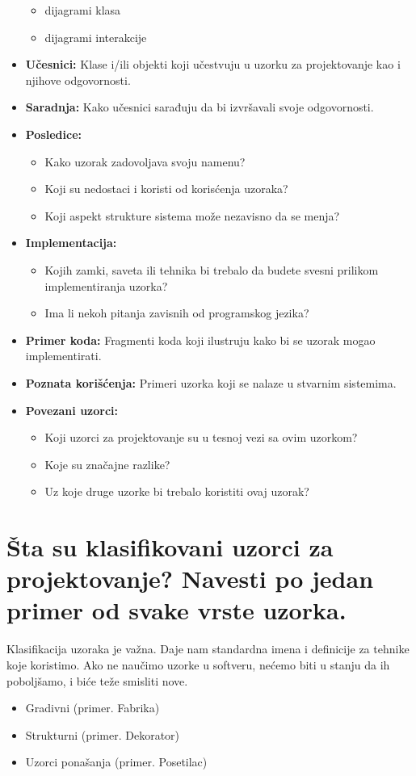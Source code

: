 \documentclass[a4paper]{article}
\begin{document}
\begin{itemize}
          \begin{itemize}
            \item dijagrami klasa
            \item dijagrami interakcije
          \end{itemize}
    \item \textbf{Učesnici:} Klase i/ili objekti koji učestvuju u uzorku za projektovanje kao i njihove odgovornosti.
    \item \textbf{Saradnja:} Kako učesnici sarađuju da bi izvršavali svoje odgovornosti.
    \item \textbf{Posledice:}
          \begin{itemize}
            \item Kako uzorak zadovoljava svoju namenu?
            \item Koji su nedostaci i koristi od korisćenja uzoraka?
            \item Koji aspekt strukture sistema može nezavisno da se menja?
          \end{itemize}
    \item \textbf{Implementacija:}
          \begin{itemize}
            \item Kojih zamki, saveta ili tehnika bi trebalo da budete svesni prilikom 
                  implementiranja uzorka?
            \item Ima li nekoh pitanja zavisnih od programskog jezika?
          \end{itemize}
    \item \textbf{Primer koda:} Fragmenti koda koji ilustruju kako bi se uzorak mogao implementirati.
    \item \textbf{Poznata korišćenja:} Primeri uzorka koji se nalaze u stvarnim sistemima.
    \item \textbf{Povezani uzorci:} 
          \begin{itemize}
            \item Koji uzorci za projektovanje su u tesnoj vezi sa ovim uzorkom?
            \item Koje su značajne razlike?
            \item Uz koje druge uzorke bi trebalo koristiti ovaj uzorak?
          \end{itemize}
  \end{itemize}

\section{Šta su klasifikovani uzorci za projektovanje? Navesti po jedan primer od svake vrste uzorka.}
  Klasifikacija uzoraka je važna. Daje nam standardna imena i definicije za tehnike koje koristimo. 
  Ako ne naučimo uzorke u softveru, nećemo biti u stanju da ih poboljšamo, i biće teže smisliti nove.
  \begin{itemize}
    \item Gradivni (primer. Fabrika)
    \item Strukturni (primer. Dekorator)
    \item Uzorci ponašanja (primer. Posetilac)
  \end{itemize}
\end{document}
